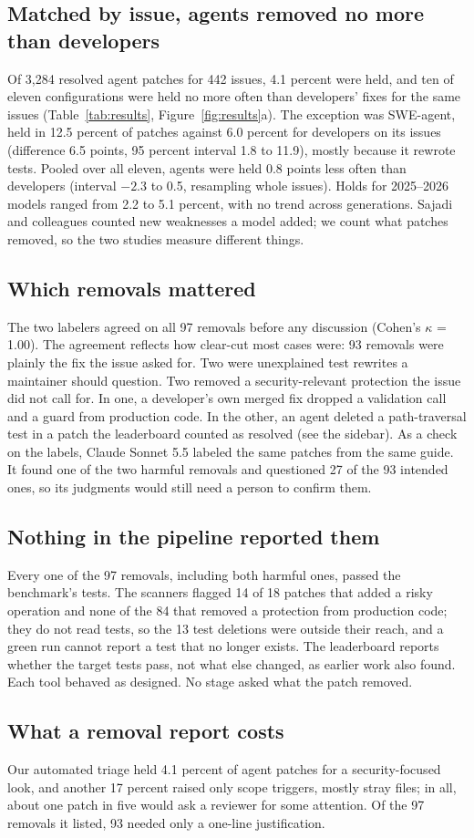 \documentclass[10pt,journal,compsoc]{IEEEtran}
\newcommand{\mgsub}[1]{\subsection*{#1}}
\begin{document}
\mgsub{Matched by issue, agents removed no more than developers}
Of 3,284 resolved agent patches for 442 issues, 4.1 percent were held, and ten
of eleven configurations were held no more often than developers' fixes for the
same issues (Table~\ref{tab:results}, Figure~\ref{fig:results}a). The exception
was SWE-agent, held in 12.5 percent of patches against 6.0 percent for
developers on its issues (difference 6.5 points, 95 percent interval 1.8 to
11.9), mostly because it rewrote tests. Pooled over all eleven, agents were held
0.8 points less often than developers (interval $-2.3$ to 0.5, resampling whole
issues). Holds for 2025--2026 models ranged from 2.2 to 5.1 percent, with no
trend across generations. Sajadi and colleagues counted new weaknesses a model
added;\cite{sajadi2025howsafe} we count what patches removed, so the two studies
measure different things.

\mgsub{Which removals mattered}
The two labelers agreed on all 97 removals before any discussion (Cohen's
$\kappa$ = 1.00). The agreement reflects how clear-cut most cases were: 93
removals were plainly the fix the issue asked for. Two were unexplained test
rewrites a maintainer should question. Two removed a security-relevant
protection the issue did not call for. In one, a developer's own merged fix
dropped a validation call and a guard from production code. In the other, an
agent deleted a path-traversal test in a patch the leaderboard counted as
resolved (see the sidebar). As a check on the labels, Claude Sonnet 5.5 labeled
the same patches from the same guide. It found one of the two harmful removals
and questioned 27 of the 93 intended ones, so its judgments would still need a
person to confirm them.

\mgsub{Nothing in the pipeline reported them}
Every one of the 97 removals, including both harmful ones, passed the
benchmark's tests. The scanners flagged 14 of 18 patches that added a risky
operation and none of the 84 that removed a protection from production code;
they do not read tests, so the 13 test deletions were outside their reach, and
a green run cannot report a test that no longer exists. The leaderboard reports
whether the target tests pass, not what else changed, as earlier work also
found.\cite{wang2026solved} Each tool behaved as designed. No stage asked what
the patch removed.

\mgsub{What a removal report costs}
Our automated triage held 4.1 percent of agent patches for a security-focused
look, and another 17 percent raised only scope triggers, mostly stray files; in
all, about one patch in five would ask a reviewer for some attention. Of the 97
removals it listed, 93 needed only a one-line justification.
\end{document}
